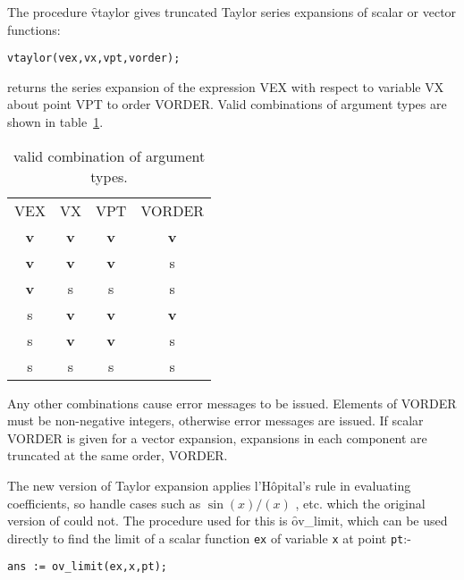 The procedure \f{vtaylor} gives truncated Taylor series expansions of scalar
or vector functions: 
\hypertarget{operator:VTAYLOR}{}
\begin{verbatim}
vtaylor(vex,vx,vpt,vorder);
\end{verbatim}
returns the series expansion of the expression
VEX  with respect to variable VX
about point VPT  to order VORDER.  Valid
combinations of argument types are shown in table~\ref{ORTHOVEC:validexp}.

\begin{table}
\begin{center}
\begin{tabular}{cccc}
VEX & VX & VPT &  VORDER \\[2ex]
\textbf{v} & \textbf{v} &  \textbf{v} &  \textbf{v}\\
\textbf{v} &  \textbf{v} & \textbf{v} & s\\
\textbf{v} & s & s & s \\
s & \textbf{v} &  \textbf{v} & \textbf{v}   \\
s & \textbf{v} & \textbf{v} & s\\
s & s & s & s\\
\end{tabular}
\end{center}
\caption{ valid combination of argument types.}\label{ORTHOVEC:validexp}
\end{table}

Any other combinations cause error messages to be issued.  Elements of
VORDER must be non-negative integers, otherwise error messages are
issued.  If scalar VORDER is given for a vector expansion, expansions
in each component are truncated at the same order, VORDER.

\hypertarget{operator:OV_LIMIT}{}
The new version of Taylor expansion applies 
l'H\^opital's rule in evaluating coefficients, so handle cases such as
$\sin(x) / (x) $ , etc.  which the original version of  could
not. The procedure used for this is \f{ov\_limit},  which can
be used directly to find the limit of a scalar function \texttt{ex} of
variable \texttt{x} at point \texttt{pt}:-

\begin{verbatim}
ans := ov_limit(ex,x,pt);
\end{verbatim}

